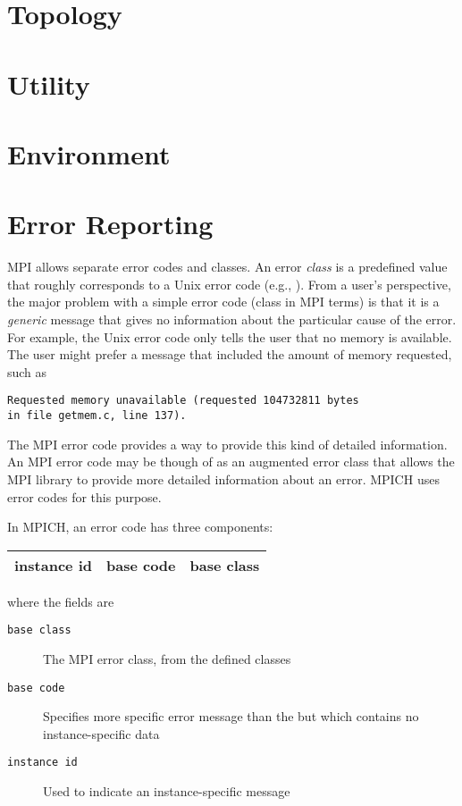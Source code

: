 \documentclass{article}
\begin{document}
\section{Topology}



\section{Utility}

 

\section{Environment}


\section{Error Reporting}
MPI allows separate error codes and classes.  An error \emph{class} is
a predefined value that roughly corresponds to a Unix error code
(e.g., ).  From a user's perspective, the major problem
with a simple error code (class in MPI terms) is that it is a
\emph{generic} message that gives no information about the particular
cause of the error.  For example, the Unix error code 
only tells the user that no memory is available.  The user might
prefer a message that included the amount of memory requested, such as 
\begin{verbatim}
Requested memory unavailable (requested 104732811 bytes 
in file getmem.c, line 137).
\end{verbatim}
The MPI error code provides a way to provide this kind of detailed
information.  An MPI error code may be though of as an
augmented error class that allows the MPI library to provide more
detailed information about an error.  MPICH uses error codes for this
purpose.  

In MPICH, an error code has three components:

\begin{center}
\begin{tabular}{|c|c|c|}
\hline
instance id&base code&base class\\
\hline
\end{tabular}
\end{center}
where the fields are
\begin{description}
\item[\texttt{base class}]The MPI error class, from the defined classes
\item[\texttt{base code}]Specifies more specific error message than
the  but which contains no instance-specific data
\item[\texttt{instance id}]Used to indicate an instance-specific message
\end{description}
\end{document}
